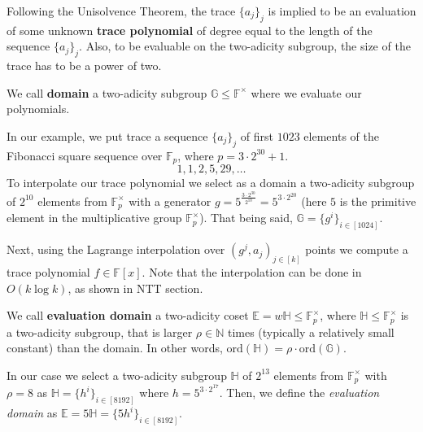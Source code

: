 \documentclass[../lecture-notes-148x210.tex]{subfiles}
\begin{document}
Following the Unisolvence Theorem, the trace $\{a_j\}_j$ is implied to be an evaluation
of some unknown \textbf{trace polynomial} of degree equal to the length of the 
sequence $\{a_j\}_j$. Also, to be
evaluable on the two-adicity subgroup, the size of the trace has to be a power
of two.

\begin{definition}
We call \textbf{domain} a two-adicity subgroup $\mathbb{G} \leq
\mathbb{F}^{\times}$ where we evaluate our polynomials.
\end{definition}

\begin{example}
In our example, we put trace a sequence $\{a_j\}_j$ of first $1023$ elements of
the Fibonacci square sequence over $\mathbb{F}_p$, where $p=3\cdot 2^{30} + 1$.
\begin{equation*}
1, 1, 2, 5, 29, \ldots
\end{equation*}
To interpolate our trace polynomial we select as a domain a two-adicity subgroup
of $2^{10}$ elements from $\mathbb{F}^\times_p$ with a generator $g =
5^{\frac{3\cdot 2^{30}}{2^{10}}} = 5^{3 \cdot 2^{20}}$ (here $5$ is the
primitive element in the multiplicative group $\mathbb{F}^\times_p$). That being
said, $\mathbb{G} = \{g^i\}_{i \in [1024]}$.
\end{example}

Next, using the Lagrange interpolation over $(g^j, a_j)_{j \in [k]}$ points
we compute a trace polynomial $f \in \mathbb{F}[x]$. Note that the interpolation 
can be done in $O(k\log k)$, as shown in NTT section.

\begin{definition}
We call \textbf{evaluation domain} a two-adicity coset $\mathbb{E} = w\mathbb{H}
\leq \mathbb{F}_p^{\times}$, where $\mathbb{H} \leq \mathbb{F}_p^{\times}$ is a
two-adicity subgroup, that is larger $\rho \in \mathbb{N}$ times (typically a
relatively small constant) than the domain. In other words,
$\text{ord}(\mathbb{H}) = \rho \cdot \text{ord}(\mathbb{G})$.
\end{definition}

\begin{example}
In our case we select a two-adicity subgroup $\mathbb{H}$ of $2^{13}$ elements
from $\mathbb{F}_p^\times$ with $\rho = 8$ as $\mathbb{H} = \{h^i\}_{i \in
[8192]}$ where $h = 5^{3 \cdot 2^{17}}$. Then, we define the \emph{evaluation
domain} as $\mathbb{E}=5\mathbb{H} = \{5h^i\}_{i \in [8192]}$.
\end{example}
\end{document}
